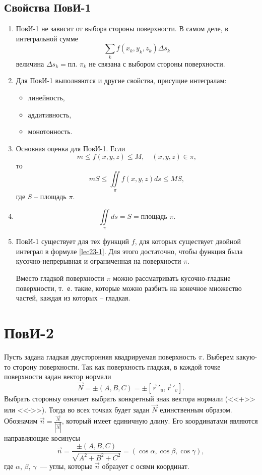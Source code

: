 \documentclass[../../main.tex]{subfiles}
\begin{document}
	\subsection{Свойства ПовИ-1}
	\begin{enumerate}[label=\arabic*$^{\circ}$]
		\item 	ПовИ-1 не зависит от выбора стороны поверхности. В самом деле, 
		в интегральной сумме \[\sum\limits_{k} f(x_k, y_k, z_k) \Delta s_k\]
		 величина $\Delta s_k = \text{пл. } \pi_k$ не связана с выбором стороны 
		 поверхности.
		 
		\item
		 Для ПовИ-1 выполняются и другие свойства, присущие интегралам:
		 \begin{itemize}
		  \item линейность,
		  \item аддитивность,
		  \item монотонность.
		 \end{itemize}

		\item Основная оценка для ПовИ-1. Если \[m \leq f(x, y, z) \leq M, \quad (x, y, z) \in \pi,\]
		  то \[mS \leq \iint \limits_\pi f(x, y, z) ds \leq MS,\] где $S$ \---
		   площадь $\pi$.
		\item \[\iint \limits_\pi ds  = S = \text{площадь }\pi.\]
		\item ПовИ-1 существует для тех функций $f$, для которых существует двойной
		 интеграл в формуле \eqref{lec23-1}. Для этого достаточно, чтобы функция была
		  кусочно-непрерывная и ограниченная на поверхности $\pi$.
		
		Вместо гладкой поверхности $\pi$ можно рассматривать кусочно-гладкие
		 поверхности, т.~е. такие, которые можно разбить на конечное множество
		  частей, каждая из которых \--- гладкая.
		\end{enumerate}
		
		\section{ПовИ-2}
		Пусть задана гладкая двусторонняя квадрируемая поверхность $\pi$. Выберем
		 какую-то сторону поверхности. Так как поверхность гладкая, в каждой точке
		  поверхности задан вектор нормали \[\vec{N} = \pm (A, B,C) = \pm
		   [\vec r\,'_u, \vec r\,'_v].\] Выбрать стороныу означает выбрать конкретный
		    знак вектора нормали (<<+>> или <<->>). 
		    Тогда во всех точках будет задан $\vec{N}$
		     единственным образом. Обозначим $\vec{n} =
		      \frac{\vec{N}}{|\vec{N}|}$, который имеет
		       единичную длину. Его координатами являются
		       направляющие косинусы
		\[\vec{n} = \frac{\pm(A,B,C)}{\sqrt{A^2 +B^2 + C^2}} = 
		(\cos \alpha, \cos \beta, \cos \gamma),\]
		где $\alpha$, $\beta$, $\gamma$~--- углы, которые $\vec n$ образует с осями координат.
\end{document}
